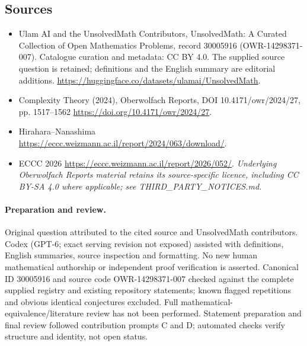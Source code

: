 \documentclass[11pt]{article}
\begin{document}
\subsection{Sources}
\begin{itemize}
\item[\hypertarget{source:30005916:1}{S1}] Ulam AI and the UnsolvedMath Contributors, UnsolvedMath: A Curated Collection of Open Mathematics Problems, record 30005916 (OWR-14298371-007). Catalogue curation and metadata: CC BY 4.0. The supplied source question is retained; definitions and the English summary are editorial additions.
\url{https://huggingface.co/datasets/ulamai/UnsolvedMath}.
\item[\hypertarget{source:30005916:2}{S2}] Complexity Theory (2024), Oberwolfach Reports, DOI 10.4171/owr/2024/27, pp. 1517--1562
\url{https://doi.org/10.4171/owr/2024/27}.
\item[\hypertarget{source:30005916:3}{S3}] Hirahara--Nanashima
\url{https://eccc.weizmann.ac.il/report/2024/063/download/}.
\item[\hypertarget{source:30005916:4}{S4}] ECCC 2026
\url{https://eccc.weizmann.ac.il/report/2026/052/}.
\textit{Underlying Oberwolfach Reports material retains its source-specific licence, including CC BY-SA 4.0 where applicable; see THIRD\_PARTY\_NOTICES.md.}
\end{itemize}
\paragraph{Preparation and review.}
Original question attributed to the cited source and UnsolvedMath contributors. Codex (GPT-6; exact serving revision not exposed) assisted with definitions, English summaries, source inspection and formatting. No new human mathematical authorship or independent proof verification is asserted. Canonical ID 30005916 and source code OWR-14298371-007 checked against the complete supplied registry and existing repository statements; known flagged repetitions and obvious identical conjectures excluded. Full mathematical-equivalence/literature review has not been performed. Statement preparation and final review followed contribution prompts C and D; automated checks verify structure and identity, not open status.
\label{end:30005916}
\end{document}

